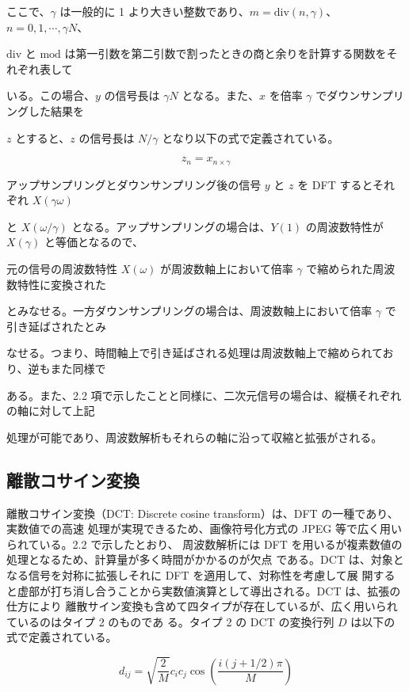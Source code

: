 \documentclass[dvipdfmx]{jsarticle}
\begin{document}
ここで、$\gamma$ は一般的に 1 より大きい整数であり、$m=\mathrm{div}(n,\gamma)$、$n=0,1,\cdots,\gamma N$、

$\mathrm{div}$ と $\mathrm{mod}$ は第一引数を第二引数で割ったときの商と余りを計算する関数をそれぞれ表して

いる。この場合、$y$ の信号長は $\gamma N$ となる。また、$x$ を倍率 $\gamma$ でダウンサンプリングした結果を

$z$ とすると、$z$ の信号長は $N/\gamma$ となり以下の式で定義されている。

\begin{equation}
z_n = x_{n\times\gamma}
\tag{5}
\end{equation}

アップサンプリングとダウンサンプリング後の信号 $y$ と $z$ を DFT するとそれぞれ $X(\gamma\omega)$

と $X(\omega/\gamma)$ となる。アップサンプリングの場合は、$Y(1)$ の周波数特性が $X(\gamma)$ と等価となるので、

元の信号の周波数特性 $X(\omega)$ が周波数軸上において倍率 $\gamma$ で縮められた周波数特性に変換された

とみなせる。一方ダウンサンプリングの場合は、周波数軸上において倍率 $\gamma$ で引き延ばされたとみ

なせる。つまり、時間軸上で引き延ばされる処理は周波数軸上で縮められており、逆もまた同様で

ある。また、2.2 項で示したことと同様に、二次元信号の場合は、縦横それぞれの軸に対して上記

処理が可能であり、周波数解析もそれらの軸に沿って収縮と拡張がされる。

\subsection{離散コサイン変換}

離散コサイン変換（DCT: Discrete cosine transform）は、DFT の一種であり、実数値での高速
処理が実現できるため、画像符号化方式の JPEG 等で広く用いられている。2.2 で示したとおり、
周波数解析には DFT を用いるが複素数値の処理となるため、計算量が多く時間がかかるのが欠点
である。DCT は、対象となる信号を対称に拡張しそれに DFT を適用して、対称性を考慮して展
開すると虚部が打ち消し合うことから実数値演算として導出される。DCT は、拡張の仕方により
離散サイン変換も含めて四タイプが存在しているが、広く用いられているのはタイプ 2 のものであ
る。タイプ 2 の DCT の変換行列 $D$ は以下の式で定義されている。

\begin{equation}
d_{ij} =
\sqrt{\frac{2}{M}}
c_i c_j
\cos
\left(
\frac{i(j+1/2)\pi}{M}
\right)
\tag{6}
\end{equation}
\end{document}
